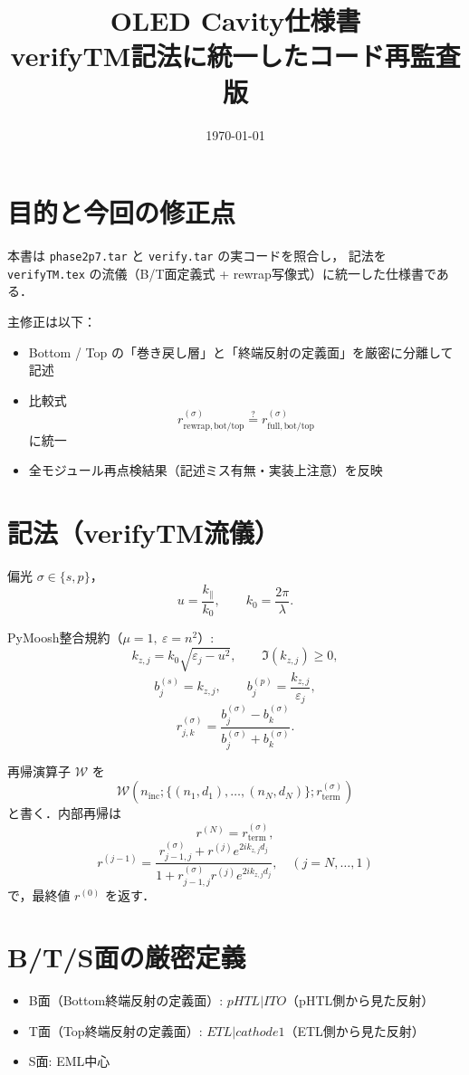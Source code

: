 \documentclass[a4paper,11pt]{article}
\title{OLED Cavity仕様書\\
\large verifyTM記法に統一したコード再監査版}
\author{}
\date{\today}
\begin{document}
\maketitle

\section{目的と今回の修正点}
本書は \texttt{phase2p7.tar} と \texttt{verify.tar} の実コードを照合し，
記法を \texttt{verifyTM.tex} の流儀（B/T面定義式 + rewrap写像式）に統一した仕様書である．

主修正は以下：
\begin{itemize}[leftmargin=1.5em]
\item Bottom / Top の「巻き戻し層」と「終端反射の定義面」を厳密に分離して記述
\item 比較式
\[
r_{\mathrm{rewrap,bot/top}}^{(\sigma)} \stackrel{?}{=} r_{\mathrm{full,bot/top}}^{(\sigma)}
\]
に統一
\item 全モジュール再点検結果（記述ミス有無・実装上注意）を反映
\end{itemize}

\section{記法（verifyTM流儀）}
偏光 \(\sigma\in\{s,p\}\)，
\[
u=\frac{k_\parallel}{k_0},\qquad k_0=\frac{2\pi}{\lambda}.
\]

PyMoosh整合規約（\(\mu=1,\ \varepsilon=n^2\)）:
\[
k_{z,j}=k_0\sqrt{\varepsilon_j-u^2},\qquad \Im(k_{z,j})\ge 0,
\]
\[
b_j^{(s)}=k_{z,j},\qquad b_j^{(p)}=\frac{k_{z,j}}{\varepsilon_j},
\]
\[
r_{j,k}^{(\sigma)}=\frac{b_j^{(\sigma)}-b_k^{(\sigma)}}{b_j^{(\sigma)}+b_k^{(\sigma)}}.
\]

再帰演算子 \(\mathcal W\) を
\[
\mathcal W\!\left(n_{\mathrm{inc}};\{(n_1,d_1),\dots,(n_N,d_N)\};r_{\mathrm{term}}^{(\sigma)}\right)
\]
と書く．内部再帰は
\[
r^{(N)}=r_{\mathrm{term}}^{(\sigma)},
\]
\[
r^{(j-1)}
=\frac{r_{j-1,j}^{(\sigma)}+r^{(j)}e^{2ik_{z,j}d_j}}
{1+r_{j-1,j}^{(\sigma)}r^{(j)}e^{2ik_{z,j}d_j}},
\quad (j=N,\dots,1)
\]
で，最終値 \(r^{(0)}\) を返す．

\section{B/T/S面の厳密定義}
\begin{itemize}[leftmargin=1.5em]
\item B面（Bottom終端反射の定義面）: \(pHTL|ITO\)（pHTL側から見た反射）
\item T面（Top終端反射の定義面）: \(ETL|cathode1\)（ETL側から見た反射）
\item S面: EML中心
\end{itemize}
\end{document}
